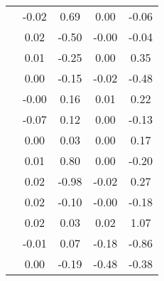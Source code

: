 \begin{table}
\begin{tabular}{c|cc|cc|}
\multicolumn{1}{|c|}{} & \multicolumn{1}{|c|}{     -0.02} & \multicolumn{1}{|c|}{      0.69} & \multicolumn{1}{|c|}{      0.00} & \multicolumn{1}{|c|}{     -0.06} \\ 
\multicolumn{1}{|c|}{} & \multicolumn{1}{|c|}{      0.02} & \multicolumn{1}{|c|}{     -0.50} & \multicolumn{1}{|c|}{     -0.00} & \multicolumn{1}{|c|}{     -0.04} \\ 
\multicolumn{1}{|c|}{} & \multicolumn{1}{|c|}{      0.01} & \multicolumn{1}{|c|}{     -0.25} & \multicolumn{1}{|c|}{      0.00} & \multicolumn{1}{|c|}{      0.35} \\ 
\multicolumn{1}{|c|}{} & \multicolumn{1}{|c|}{      0.00} & \multicolumn{1}{|c|}{     -0.15} & \multicolumn{1}{|c|}{     -0.02} & \multicolumn{1}{|c|}{     -0.48} \\ 
\multicolumn{1}{|c|}{} & \multicolumn{1}{|c|}{     -0.00} & \multicolumn{1}{|c|}{      0.16} & \multicolumn{1}{|c|}{      0.01} & \multicolumn{1}{|c|}{      0.22} \\ 
\multicolumn{1}{|c|}{} & \multicolumn{1}{|c|}{     -0.07} & \multicolumn{1}{|c|}{      0.12} & \multicolumn{1}{|c|}{      0.00} & \multicolumn{1}{|c|}{     -0.13} \\ 
\multicolumn{1}{|c|}{} & \multicolumn{1}{|c|}{      0.00} & \multicolumn{1}{|c|}{      0.03} & \multicolumn{1}{|c|}{      0.00} & \multicolumn{1}{|c|}{      0.17} \\ 
\multicolumn{1}{|c|}{} & \multicolumn{1}{|c|}{      0.01} & \multicolumn{1}{|c|}{      0.80} & \multicolumn{1}{|c|}{      0.00} & \multicolumn{1}{|c|}{     -0.20} \\ 
\multicolumn{1}{|c|}{} & \multicolumn{1}{|c|}{      0.02} & \multicolumn{1}{|c|}{     -0.98} & \multicolumn{1}{|c|}{     -0.02} & \multicolumn{1}{|c|}{      0.27} \\ 
\multicolumn{1}{|c|}{} & \multicolumn{1}{|c|}{      0.02} & \multicolumn{1}{|c|}{     -0.10} & \multicolumn{1}{|c|}{     -0.00} & \multicolumn{1}{|c|}{     -0.18} \\ 
\multicolumn{1}{|c|}{} & \multicolumn{1}{|c|}{      0.02} & \multicolumn{1}{|c|}{      0.03} & \multicolumn{1}{|c|}{      0.02} & \multicolumn{1}{|c|}{      1.07} \\ 
\multicolumn{1}{|c|}{} & \multicolumn{1}{|c|}{     -0.01} & \multicolumn{1}{|c|}{      0.07} & \multicolumn{1}{|c|}{     -0.18} & \multicolumn{1}{|c|}{     -0.86} \\ 
\multicolumn{1}{|c|}{} & \multicolumn{1}{|c|}{      0.00} & \multicolumn{1}{|c|}{     -0.19} & \multicolumn{1}{|c|}{     -0.48} & \multicolumn{1}{|c|}{     -0.38} \\ 

\end{tabular}
\end{table}
